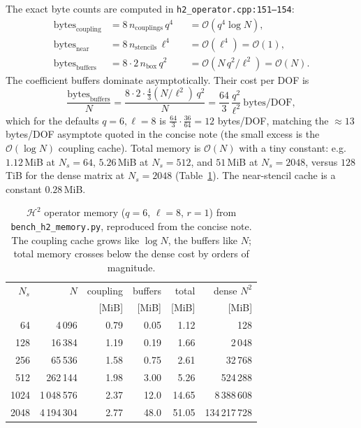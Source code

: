 \documentclass[11pt,a4paper]{article}
\newcommand{\Order}{\mathcal{O}}
\newcommand{\Htwo}{\mathcal{H}^2}
\newcommand{\code}[1]{\texttt{#1}}
\theoremstyle{definition}
\theoremstyle{remark}
\begin{document}
The exact byte counts are computed in \code{h2\_operator.cpp:151--154}:
\begin{equation}
\begin{aligned}
  \text{bytes}_{\text{coupling}} &= 8\,n_{\text{couplings}}\,q^4
     &&= \Order(q^4\log N),\\
  \text{bytes}_{\text{near}} &= 8\,n_{\text{stencils}}\,\ell^4
     &&= \Order(\ell^4) = \Order(1),\\
  \text{bytes}_{\text{buffers}} &= 8\cdot 2\,n_{\text{box}}\,q^2
     &&= \Order(N\,q^2/\ell^2) = \Order(N).
\end{aligned}
\label{eq:bytes}
\end{equation}
The coefficient buffers dominate asymptotically. Their cost per DOF is
\begin{equation}
  \frac{\text{bytes}_{\text{buffers}}}{N}
  = \frac{8\cdot2\cdot\tfrac43 (N/\ell^2)\,q^2}{N}
  = \frac{64}{3}\,\frac{q^2}{\ell^2}\ \text{bytes/DOF},
\end{equation}
which for the defaults $q=6,\ell=8$ is $\tfrac{64}{3}\cdot\tfrac{36}{64}=12$
bytes/DOF, matching the $\approx 13$ bytes/DOF asymptote quoted in the concise
note (the small excess is the $\Order(\log N)$ coupling cache). Total memory is
$\Order(N)$ with a tiny constant: e.g.\ $1.12$\,MiB at $N_s=64$, $5.26$\,MiB at
$N_s=512$, and $51$\,MiB at $N_s=2048$, versus $128$\,TiB for the dense matrix at
$N_s=2048$ (Table~\ref{tab:mem}). The near-stencil cache is a constant
$0.28$\,MiB.

\begin{table}[h]
\centering
\begin{tabular}{rrrrrr}
\toprule
$N_s$ & $N$ & coupling & buffers & total & dense $N^2$ \\
      &     & [MiB]    & [MiB]   & [MiB] & [MiB] \\
\midrule
64   & 4\,096      & 0.79 & 0.05 & 1.12  & 128 \\
128  & 16\,384     & 1.19 & 0.19 & 1.66  & 2\,048 \\
256  & 65\,536     & 1.58 & 0.75 & 2.61  & 32\,768 \\
512  & 262\,144    & 1.98 & 3.00 & 5.26  & 524\,288 \\
1024 & 1\,048\,576 & 2.37 & 12.0 & 14.65 & 8\,388\,608 \\
2048 & 4\,194\,304 & 2.77 & 48.0 & 51.05 & 134\,217\,728 \\
\bottomrule
\end{tabular}
\caption{$\Htwo$ operator memory ($q=6$, $\ell=8$, $r=1$) from
\code{bench\_h2\_memory.py}, reproduced from the concise note. The coupling cache
grows like $\log N$, the buffers like $N$; total memory crosses below the dense
cost by orders of magnitude.}
\label{tab:mem}
\end{table}
\end{document}
